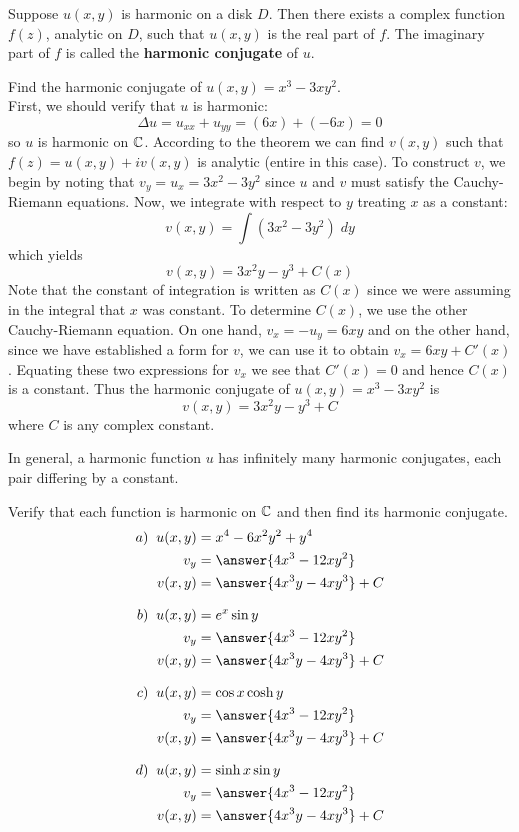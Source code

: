 \documentclass[handout]{ximera}
\begin{document}
  
\begin{theorem}
Suppose $u(x,y)$ is harmonic on a disk $D$.  Then there exists a complex function $f(z)$, analytic on $D$, 
such that $u(x,y)$ is the real part of $f$. The imaginary part of $f$ is called the {\bf harmonic conjugate} of $u$.
\end{theorem}


\begin{example}
Find the harmonic conjugate of $u(x,y) = x^3 - 3xy^2$.\\
First, we should verify that $u$ is harmonic:
\[
\Delta u = u_{xx} + u_{yy} = (6x) + (-6x) = 0
\]
so $u$ is harmonic on $\mathbb C$. According to the theorem we can find $v(x,y)$ such that
$f(z) = u(x,y) + iv(x,y)$ is analytic (entire in this case). To construct $v$, we begin by noting that
$v_y = u_x = 3x^2 - 3y^2$ since $u$ and $v$ must satisfy the Cauchy-Riemann equations.
Now, we integrate with respect to $y$ treating $x$ as a constant:
\[
v(x,y) = \int \left(3x^2 -3y^2\right) \; dy
\]
which yields
\[
v(x,y) = 3x^2y - y^3 + C(x)
\]
Note that the constant of integration is written as $C(x)$ since we were assuming in 
the integral that $x$ was constant. To determine $C(x)$, we use the other Cauchy-Riemann equation. 
On one hand, $v_x = -u_y = 6xy$ and on the other hand, since we have established a form for $v$, we can use it
to obtain $v_x = 6xy + C'(x)$. Equating these two expressions for $v_x$ we see 
that $C'(x) =0$ and hence $C(x)$ is a constant. Thus the harmonic conjugate of $u(x,y) = x^3 - 3xy^2$ is
\[
v(x,y) = 3x^2y - y^3 + C
\]
where $C$ is any complex constant.
\end{example}

\begin{remark}
In general, a harmonic function $u$ has infinitely many harmonic conjugates, each pair differing by a constant.
\end{remark}

\begin{problem}
Verify that each function is harmonic on $\mathbb C$ and then find its harmonic conjugate.
\begin{align*}
a) \;\;u(x,y) &= x^4 -6x^2y^2 + y^4\\
v_y &= \answer{4x^3 - 12xy^2}\\
v(x,y) &= \answer{4x^3y - 4xy^3}+C\\[8pt]
b) \;\;u(x,y) &= e^x\sin y\\
v_y &= \answer{4x^3 - 12xy^2}\\
v(x,y) &= \answer{4x^3y - 4xy^3}+C\\[8pt]
c) \;\;u(x,y) &= \cos x \cosh y\\
v_y &= \answer{4x^3 - 12xy^2}\\
v(x,y) &= \answer{4x^3y - 4xy^3}+C\\[8pt]
d) \;\; u(x,y) &= \sinh x \sin y\\
v_y &= \answer{4x^3 - 12xy^2}\\
v(x,y) &= \answer{4x^3y - 4xy^3}+C
\end{align*}
\end{problem}
\end{document}
